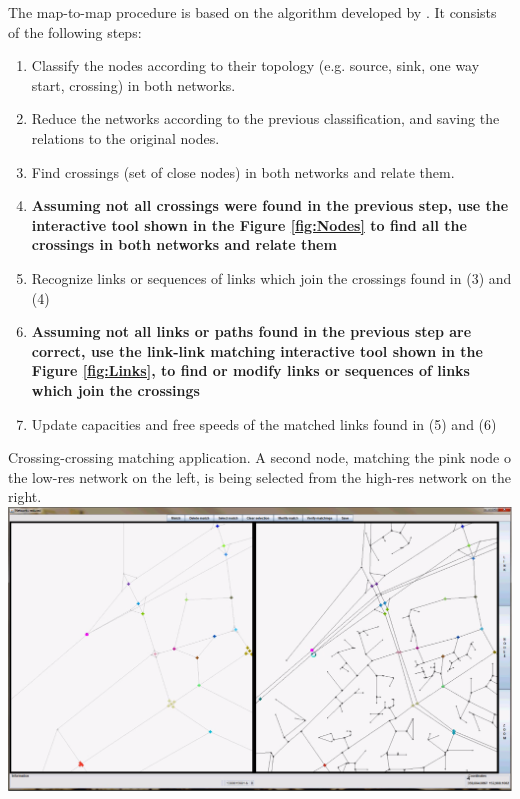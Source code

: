 The map-to-map procedure is based on the algorithm developed by \citet{BalmerEtAl_STRC_2005}. It consists of the following steps:

\begin{enumerate}
\item Classify the nodes according to their topology (e.g. source, sink, one way start, crossing) in both networks.
\item Reduce the networks according to the previous classification, and saving the relations to the original nodes.
\item Find crossings (set of close nodes) in both networks and relate them.
\item \textbf{Assuming not all crossings were found in the previous step, use the interactive tool shown in the Figure \ref{fig:Nodes} to find all the crossings in both networks and relate them}
\item Recognize links or sequences of links which join the crossings found in (3) and (4)
\item \textbf{Assuming not all links or paths found in the previous step are correct, use the link-link matching interactive tool shown in the Figure \ref{fig:Links}, to find or modify links or sequences of links which join the crossings}
\item Update capacities and free speeds of the matched links found in (5) and (6)
\end{enumerate}

\createfigure
{}
{Crossing-crossing matching application. A second node, matching the pink node o the low-res network on the left, is being selected from the high-res network on the right.}
{\label{fig:Nodes}}
{\includegraphics[width=1.0\textwidth]{extending/figures/netEdSing/Nodes.png}}
{}

